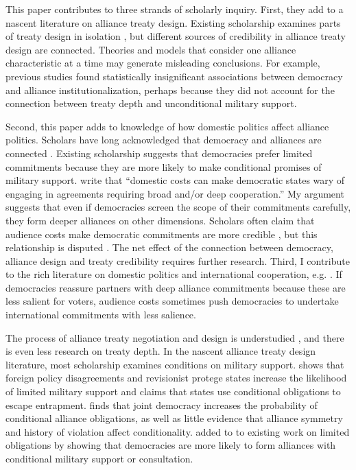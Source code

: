 \documentclass[12pt]{article}
\begin{document}
This paper contributes to three strands of scholarly inquiry.
First, they add to a nascent literature on alliance treaty design.  
Existing scholarship examines parts of treaty design in isolation \citep{Benson2012, Mattes2012, Chibaetal2015}, but different sources of credibility in alliance treaty design are connected. 
Theories and models that consider one alliance characteristic at a time may generate misleading conclusions. 
For example, previous studies found statistically insignificant associations between democracy and alliance institutionalization, perhaps because they did not account for the connection between treaty depth and unconditional military support. 


Second, this paper adds to knowledge of how domestic politics affect alliance politics. 
Scholars have long acknowledged that democracy and alliances are connected \citep{LaiReiter2000, GiblerWolford2006, Mattes2012, Warren2016, McManusYarhi-Milo2017}. 
Existing scholarship suggests that democracies prefer limited commitments \citep{Mattes2012, Chibaetal2015} because they are more likely to make conditional promises of military support. 
\citet{Chibaetal2015} write that ``domestic costs can make democratic states wary of engaging in agreements requiring broad and/or deep cooperation.'' 
My argument suggests that even if democracies screen the scope of their commitments carefully, they form deeper alliances on other dimensions.  
Scholars often claim that audience costs make democratic commitments are more credible \citep{Gaubatz1996, Leedsetal2009, DigiuseppePoast2016}, but this relationship is disputed \citep{GartzkeGleditsch2004, DownesSechser2012}. 
The net effect of the connection between democracy, alliance design and treaty credibility requires further research. 
Third, I contribute to the rich literature on domestic politics and international cooperation, e.g. \citep{DownesRocke1995, Fearon1998, Leeds1999, MattesRodriguez2014}. 
If democracies reassure partners with deep alliance commitments because these are less salient for voters, audience costs sometimes push democracies to undertake international commitments with less salience. 


The process of alliance treaty negotiation and design is understudied \citep{Poast2019a}, and there is even less research on treaty depth. 
In the nascent alliance treaty design literature, most scholarship examines conditions on military support.
\citet{Benson2012} shows that foreign policy disagreements and revisionist protege states increase the likelihood of limited military support and \citet{Kim2011} claims that states use conditional obligations to escape entrapment. 
\citet{Mattes2012} finds that joint democracy increases the probability of conditional alliance obligations, as well as little evidence that alliance symmetry and history of violation affect conditionality. 
\citet{Chibaetal2015} added to to existing work on limited obligations by showing that democracies are more likely to form alliances with conditional military support or consultation. 
\end{document}
